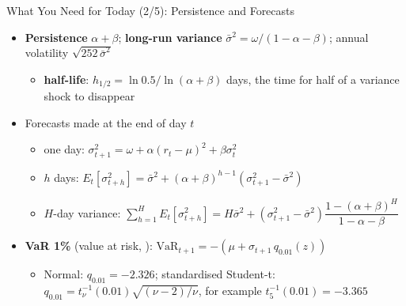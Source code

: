 \begin{frame}{What You Need for Today (2/5): Persistence and Forecasts}
\itemsize{\small}
\begin{itemize}
    \item \textbf{Persistence} $\alpha + \beta$; \textbf{long-run variance} $\bar\sigma^2 = \omega/(1 - \alpha - \beta)$; annual volatility $\sqrt{252\,\bar\sigma^2}$
    \begin{itemize}
        \item \textbf{half-life}: $h_{1/2} = \ln 0.5/\ln(\alpha + \beta)$ days, the time for half of a variance shock to disappear
    \end{itemize}
    \item Forecasts made at the end of day $t$
    \begin{itemize}
        \item one day: $\sigma_{t+1}^2 = \omega + \alpha(r_t - \mu)^2 + \beta\sigma_t^2$
        \item $h$ days: $E_t[\sigma_{t+h}^2] = \bar\sigma^2 + (\alpha + \beta)^{h-1}(\sigma_{t+1}^2 - \bar\sigma^2)$
        \item $H$-day variance: $\sum_{h=1}^{H}E_t[\sigma_{t+h}^2] = H\bar\sigma^2 + (\sigma_{t+1}^2 - \bar\sigma^2)\dfrac{1 - (\alpha + \beta)^H}{1 - \alpha - \beta}$
    \end{itemize}
    \item \textbf{VaR 1\%} (value at risk, ): $\mathrm{VaR}_{t+1} = -(\mu + \sigma_{t+1}\,q_{0.01}(z))$
    \begin{itemize}
        \item Normal: $q_{0.01} = -2.326$; standardised Student-t: $q_{0.01} = t_\nu^{-1}(0.01)\sqrt{(\nu - 2)/\nu}$, for example $t_5^{-1}(0.01) = -3.365$
    \end{itemize}
\end{itemize}
\end{frame}

